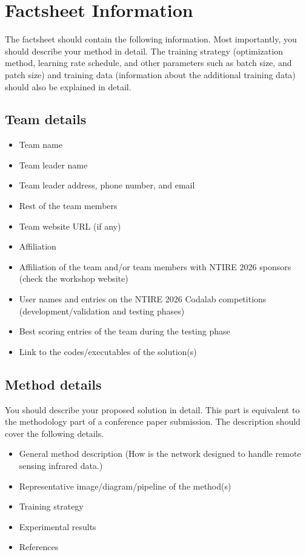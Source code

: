 \documentclass[10pt,twocolumn,letterpaper]{article}
\begin{document}
\section{Factsheet Information}

The factsheet should contain the following information. Most importantly, you should describe your method in detail. The training strategy (optimization method, learning rate schedule, and other parameters such as batch size, and patch size) and training data (information about the additional training data) should also be explained in detail.

\subsection{Team details}

\begin{itemize}
\item Team name                                  
\item Team leader name                           
\item Team leader address, phone number, and email 
\item Rest of the team members        
\item Team website URL (if any)                   
\item Affiliation
\item Affiliation of the team and/or team members with NTIRE 2026 sponsors (check the workshop website) %
\item User names and entries on the NTIRE 2026 Codalab competitions (development/validation and testing phases) %
\item Best scoring entries of the team during the testing phase
\item Link to the codes/executables of the solution(s)
\end{itemize}

\subsection{Method details}

You should describe your proposed solution in detail. This part is equivalent to the methodology part of a conference paper submission. The description should cover the following details.

\begin{itemize}
\item General method description (How is the network designed to handle remote sensing infrared data.) %
\item Representative image/diagram/pipeline of the method(s)  
\item Training strategy
\item Experimental results
\item References                                               
\end{itemize}
\end{document}
